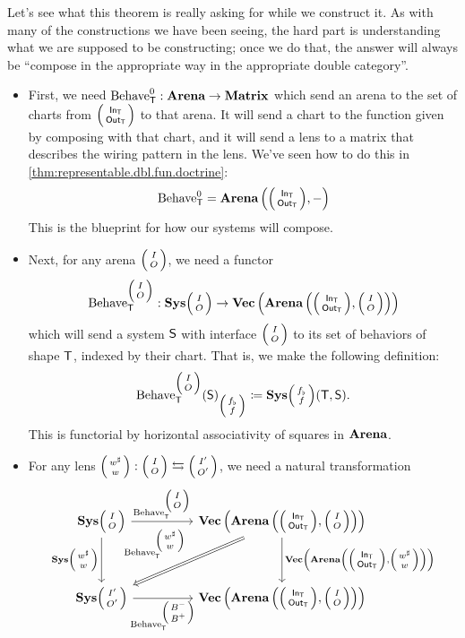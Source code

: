 \documentclass[DynamicalBook]{subfiles}
\begin{document}
Let's see what this theorem is really asking for while we construct it. As with
many of the constructions we have been seeing, the hard part is understanding
what we are supposed to be constructing; once we do that, the answer will always
be ``compose in the appropriate way in the appropriate double category''.
\begin{itemize}
  \item First, we need $\mathrm{Behave}_{\mathsf{T}}^0 : \textbf{Arena} \to
    \textbf{Matrix}$ which send an arena to the set of charts from
    $\lens{\In{T}}{\Out{T}}$ to that arena. It will send a chart to the function
    given by composing with that chart, and it will send a lens to a matrix that
    describes the wiring pattern in the lens. We've seen how to do this in \cref{thm:representable.dbl.fun.doctrine}:
    $$\Fun{Behave}^0_{\Sys{T}} = \Cat{Arena}\left( \littlelens{\In{T}}{\Out{T}},
      -\right)$$
This is the blueprint for how our systems will compose.
  \item Next, for any arena $\lens{I}{O}$, we need a functor
    \[\Fun{Behave}_{\Sys{T}}^{\littlelens{I}{O}} :
    \Cat{Sys}\littlelens{I}{O} \to \Cat{Vec}\left( \Cat{Arena}\left( \littlelens{\In{T}}{\Out{T}},
      \littlelens{I}{O}\right) \right)\]
    which will send a system $\mathsf{S}$ with interface $\lens{I}{O}$ to its
    set of behaviors of shape $\mathsf{T}$, indexed by their chart. That is, we
    make the following definition:
   \[
\Fun{Behave}_{\Sys{T}}^{\littlelens{I}{O}}(\Sys{S})_{\littlelens{f_{\flat}}{f}}
\coloneqq \Cat{Sys}\littlelens{f_{\flat}}{f}(\Sys{T}, \Sys{S}). 
\]
This is functorial by horizontal associativity of squares in $\textbf{Arena}$.
\item For any lens $\lens{w^{\sharp}}{w} : \lens{I}{O} \fromto \lens{I'}{O'}$,
  we need a natural transformation
  \[
    \begin{tikzcd}
\Cat{Sys}\lens{I}{O} \ar[dd, "{\Cat{Sys}\littlelens{w^{\sharp}}{w}}"'] \ar[rr, "{\Fun{Behave}_{\Sys{T}}^{\littlelens{I}{O}}}"] & & \Cat{Vec}\left( \Cat{Arena}\left(
    \littlelens{\In{T}}{\Out{T}}, \littlelens{I}{O} \right) \right) \ar[dd, "{\Cat{Vec}\left(
  \Cat{Arena}\left( \littlelens{\In{T}}{\Out{T}}, \littlelens{w^{\sharp}}{w}
  \right)\right)}"] \ar[ddll, Rightarrow, "{\Fun{Behave}_{\Sys{T}}^{\littlelens{w^{\sharp}}{w}}}"']\\
 & & \\
\Cat{Sys}\lens{I'}{O'}  \ar[rr, "{\Fun{Behave}_{\Sys{T}}^{\littlelens{B^-}{B^+}} }"']& & \Cat{Vec}\left( \Cat{Arena}\left(
    \littlelens{\In{T}}{\Out{T}}, \littlelens{I}{O} \right) \right) \\

\end{tikzcd}\]
\end{itemize}
\end{document}
